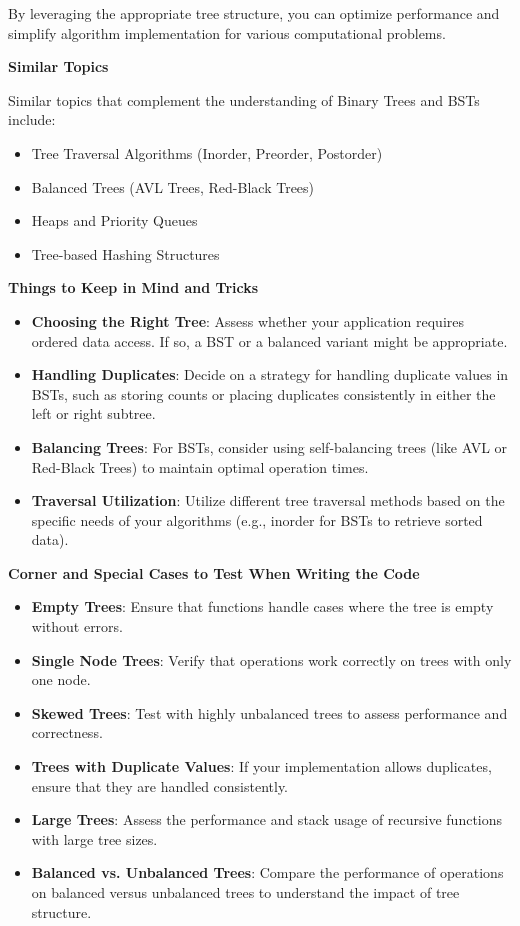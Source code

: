 By leveraging the appropriate tree structure, you can optimize performance and simplify algorithm implementation for various computational problems.

\textbf{Similar Topics}

Similar topics that complement the understanding of Binary Trees and BSTs include:
\begin{itemize}
    \item Tree Traversal Algorithms (Inorder, Preorder, Postorder)
    \item Balanced Trees (AVL Trees, Red-Black Trees)
    \item Heaps and Priority Queues
    \item Tree-based Hashing Structures
\end{itemize}

\textbf{Things to Keep in Mind and Tricks}

\begin{itemize}
    \item \textbf{Choosing the Right Tree}: Assess whether your application requires ordered data access. If so, a BST or a balanced variant might be appropriate.
    \item \textbf{Handling Duplicates}: Decide on a strategy for handling duplicate values in BSTs, such as storing counts or placing duplicates consistently in either the left or right subtree.
    \item \textbf{Balancing Trees}: For BSTs, consider using self-balancing trees (like AVL or Red-Black Trees) to maintain optimal operation times.
    \item \textbf{Traversal Utilization}: Utilize different tree traversal methods based on the specific needs of your algorithms (e.g., inorder for BSTs to retrieve sorted data).
\end{itemize}

\textbf{Corner and Special Cases to Test When Writing the Code}

\begin{itemize}
    \item \textbf{Empty Trees}: Ensure that functions handle cases where the tree is empty without errors.
    \item \textbf{Single Node Trees}: Verify that operations work correctly on trees with only one node.
    \item \textbf{Skewed Trees}: Test with highly unbalanced trees to assess performance and correctness.
    \item \textbf{Trees with Duplicate Values}: If your implementation allows duplicates, ensure that they are handled consistently.
    \item \textbf{Large Trees}: Assess the performance and stack usage of recursive functions with large tree sizes.
    \item \textbf{Balanced vs. Unbalanced Trees}: Compare the performance of operations on balanced versus unbalanced trees to understand the impact of tree structure.
\end{itemize}